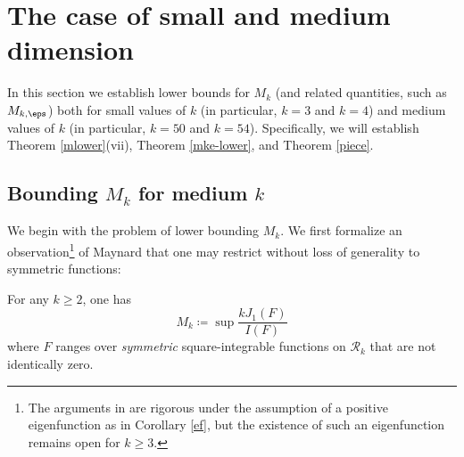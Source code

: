 \section{The case of small and medium dimension}\label{h1-sec}

In this section we establish lower bounds for $M_k$ (and related quantities, such as $M_{k,\eps}$) both for small values of $k$ (in particular, $k=3$ and $k=4$) and medium values of $k$ (in particular, $k=50$ and $k=54$).  Specifically, we will establish Theorem \ref{mlower}(vii), Theorem \ref{mke-lower}, and Theorem \ref{piece}.

\subsection{Bounding \texorpdfstring{$M_k$}{Mk} for medium \texorpdfstring{$k$}{k}}

We begin with the problem of lower bounding $M_k$.  We first formalize an observation\footnote{The arguments in \cite{maynard-new} are rigorous under the assumption of a positive eigenfunction as in Corollary \ref{ef}, but the existence of such an eigenfunction remains open for $k \geq 3$.} of Maynard \cite{maynard-new} that one may restrict without loss of generality to symmetric functions:

\begin{lemma}  For any $k \geq 2$, one has
$$ M_k \coloneqq \sup \frac{k J_1(F)}{I(F)}$$
where $F$ ranges over \emph{symmetric} square-integrable functions on ${\mathcal R}_k$ that are not identically zero.
\end{lemma}

